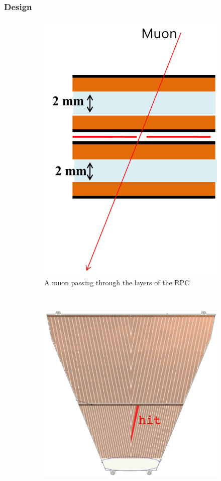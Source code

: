 \subsubsection{Design}

\begin{figure}
  \centering
  \begin{subfigure}[b]{0.4\textwidth}
    \centering
    \includegraphics[width=0.8\linewidth]{./figures/rpc_1_muon_hit}
    \caption{A muon passing through the layers of the RPC}
    \label{fig:rpc_hit_side_view}
  \end{subfigure}%
  ~
  \begin{subfigure}[b]{0.4\textwidth}
    \centering
    \includegraphics[width=0.8\linewidth]{./figures/rpc_1_muon_hit_side}

\end{subfigure}
\end{figure}
